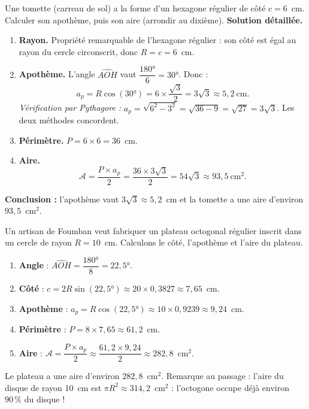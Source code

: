 \documentclass[11pt]{article}
\begin{document}
\begin{exoresolu}
Une tomette (carreau de sol) a la forme d'un hexagone régulier de côté $c = 6$~cm. Calculer son apothème, puis son aire (arrondir au dixième).
\tcblower
\textbf{Solution détaillée.}
\begin{enumerate}
\item \textbf{Rayon.} Propriété remarquable de l'hexagone régulier : son côté est égal au rayon du cercle circonscrit, donc $R = c = 6$~cm.
\item \textbf{Apothème.} L'angle $\widehat{AOH}$ vaut $\dfrac{180°}{6} = 30°$. Donc :
\[ a_p = R\cos(30°) = 6 \times \frac{\sqrt{3}}{2} = 3\sqrt{3} \approx 5{,}2~\text{cm}. \]
\emph{Vérification par Pythagore :} $a_p = \sqrt{6^2 - 3^2} = \sqrt{36 - 9} = \sqrt{27} = 3\sqrt{3}$. Les deux méthodes concordent.
\item \textbf{Périmètre.} $P = 6 \times 6 = 36$~cm.
\item \textbf{Aire.}
\[ \mathcal{A} = \frac{P \times a_p}{2} = \frac{36 \times 3\sqrt{3}}{2} = 54\sqrt{3} \approx 93{,}5~\text{cm}^2. \]
\end{enumerate}
\textbf{Conclusion :} l'apothème vaut $3\sqrt{3} \approx 5{,}2$~cm et la tomette a une aire d'environ $93{,}5$~cm$^2$.
\end{exoresolu}

\begin{exemplebox}
Un artisan de Foumban veut fabriquer un plateau octogonal régulier inscrit dans un cercle de rayon $R = 10$~cm. Calculons le côté, l'apothème et l'aire du plateau.
\begin{enumerate}
\item \textbf{Angle} : $\widehat{AOH} = \dfrac{180°}{8} = 22{,}5°$.
\item \textbf{Côté} : $c = 2R\sin(22{,}5°) \approx 20 \times 0{,}3827 \approx 7{,}65$~cm.
\item \textbf{Apothème} : $a_p = R\cos(22{,}5°) \approx 10 \times 0{,}9239 \approx 9{,}24$~cm.
\item \textbf{Périmètre} : $P = 8 \times 7{,}65 \approx 61{,}2$~cm.
\item \textbf{Aire} : $\mathcal{A} = \dfrac{P \times a_p}{2} \approx \dfrac{61{,}2 \times 9{,}24}{2} \approx 282{,}8$~cm$^2$.
\end{enumerate}
Le plateau a une aire d'environ $282{,}8$~cm$^2$. Remarque au passage : l'aire du disque de rayon 10~cm est $\pi R^2 \approx 314{,}2$~cm$^2$ : l'octogone occupe déjà environ $90\,\%$ du disque !
\end{exemplebox}
\end{document}
